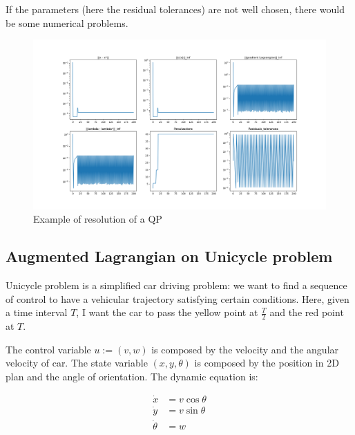 \documentclass{report}
\begin{document}
\newpage
If the parameters (here the residual tolerances) are not well chosen, there would be some numerical problems. 

\begin{figure}[h]
\centering
\includegraphics[scale=0.35]{numerical_problem}
\caption{Example of resolution of a QP}
\end{figure}

\subsection*{Augmented Lagrangian on Unicycle problem}
Unicycle problem is a simplified car driving problem: we want to find a sequence of control to have a vehicular trajectory satisfying certain conditions. Here, given a time interval $T$, I want the car to pass the yellow point at $\frac{T}{2}$ and the red point at $T$.

The control variable $u:= (v, w)$ is composed by the velocity and the angular velocity of car. The state variable $(x, y , \theta)$ is composed by the position in 2D plan and the angle of orientation. The dynamic equation is:

\begin{equation}
\begin{aligned}
\dot{x} &= v \cos{\theta} \\
\dot{y} &= v \sin{\theta} \\
\dot{\theta} &= w 
\end{aligned}
\end{equation}
\end{document}
